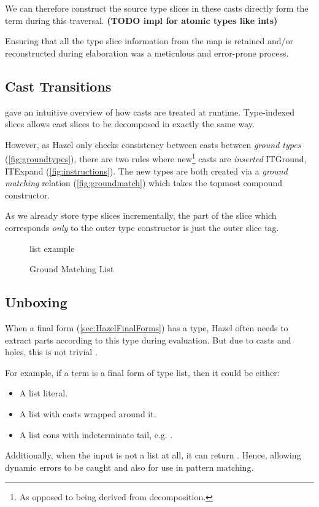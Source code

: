 We can therefore construct the source type slices in these casts directly form the term during this traversal. \textbf{(TODO impl for atomic types like ints)}

Ensuring that all the type slice information from the  map is retained and/or reconstructed during elaboration was a meticulous and error-prone process.

\subsection{Cast Transitions}
 gave an intuitive overview of how casts are treated at runtime. Type-indexed slices allows cast slices to be decomposed in exactly the same way. 

However, as Hazel only checks consistency between casts between \textit{ground types} (\cref{fig:groundtypes}), there are two rules where new\footnote{As opposed to being derived from decomposition.} casts are \textit{inserted} ITGround, ITExpand (\cref{fig:instructions}). The new types are both created via a \textit{ground matching} relation (\cref{fig:groundmatch}) which takes the topmost compound constructor. 

As we already store type slices incrementally, the part of the slice which corresponds \textit{only} to the outer type constructor is just the outer slice tag.

\begin{figure}
list example
\caption{Ground Matching List}
\end{figure}

\subsection{Unboxing}
When a final form (\cref{sec:HazelFinalForms}) has a type, Hazel often needs to extract parts according to this type during evaluation. But due to casts and holes, this is not trivial \cite{LivePatternMatching}.

For example, if a term is a final form of type list, then it could be either:
\begin{itemize}
\item A list literal.
\item A list with casts wrapped around it.
\item A list cons with indeterminate tail, e.g. .
\end{itemize}
Additionally, when the input is not a list at all, it can return . Hence, allowing dynamic errors to be caught and also for use in pattern matching. 

